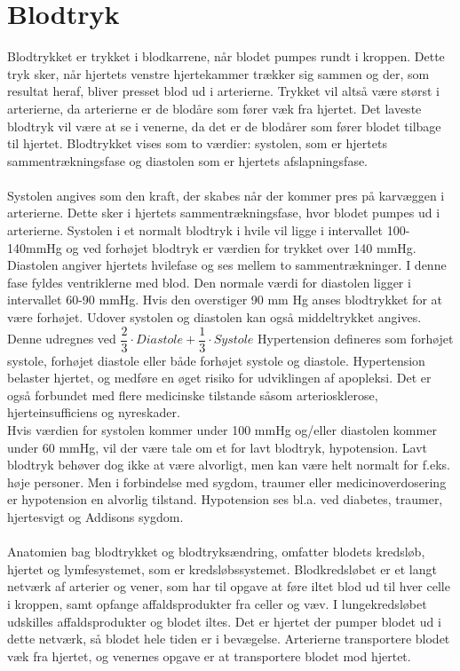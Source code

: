\section{Blodtryk}
Blodtrykket er trykket i blodkarrene, når blodet pumpes rundt i kroppen. Dette tryk sker, når hjertets venstre hjertekammer trækker sig sammen og der, som resultat heraf, bliver presset blod ud i arterierne. Trykket vil altså være størst i arterierne, da arterierne er de blodåre som fører væk fra hjertet. Det laveste blodtryk vil være at se i venerne, da det er de blodårer som fører blodet tilbage til hjertet. Blodtrykket vises som to værdier: systolen, som er hjertets sammentrækningsfase og diastolen som er hjertets afslapningsfase. \\\\
Systolen angives som den kraft, der skabes når der kommer pres på karvæggen i arterierne. Dette sker i hjertets sammentrækningsfase, hvor blodet pumpes ud i arterierne. Systolen i et normalt blodtryk i hvile vil ligge i intervallet 100-140mmHg og ved forhøjet blodtryk er værdien for trykket over 140 mmHg.\\ Diastolen angiver hjertets hvilefase og ses mellem to sammentrækninger. I denne fase fyldes ventriklerne med blod. Den normale værdi for diastolen ligger i intervallet 60-90 mmHg. Hvis den overstiger 90 mm Hg anses blodtrykket for at være forhøjet. Udover systolen og diastolen kan også middeltrykket angives. Denne udregnes ved $\dfrac{2}{3}\cdot Diastole + \dfrac{1}{3}\cdot Systole$ \cite{blodtrykwiki}
Hypertension defineres som forhøjet systole, forhøjet diastole eller både forhøjet systole og diastole. Hypertension belaster hjertet, og medføre en øget risiko for udviklingen af apopleksi. Det er også forbundet med flere medicinske tilstande såsom arteriosklerose, hjerteinsufficiens og nyreskader. \cite{pulmonal}\\
Hvis værdien for systolen kommer under 100 mmHg og/eller diastolen kommer under 60 mmHg, vil der være tale om et for lavt blodtryk, hypotension. Lavt blodtryk behøver dog ikke at være alvorligt, men kan være helt normalt for f.eks. høje personer. Men i forbindelse med sygdom, traumer eller medicinoverdosering er hypotension en alvorlig tilstand. Hypotension ses bl.a. ved diabetes, traumer, hjertesvigt og Addisons sygdom. \cite{hypo}
 \\\\
Anatomien bag blodtrykket og blodtryksændring, omfatter blodets kredsløb, hjertet og lymfesystemet, som er kredsløbssystemet. Blodkredsløbet er et langt netværk af arterier og vener, som har til opgave at føre iltet blod ud til hver celle i kroppen, samt opfange affaldsprodukter fra celler og væv.\cite{pulmonal}  I lungekredsløbet udskilles affaldsprodukter og blodet iltes. Det er hjertet der pumper blodet ud i dette netværk, så blodet hele tiden er i bevægelse. Arterierne transportere blodet væk fra hjertet, og venernes opgave er at transportere blodet mod hjertet. 
